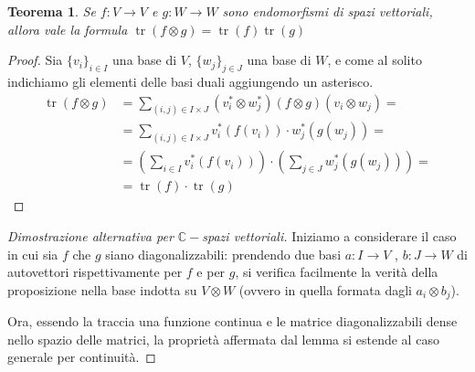 \documentclass[11pt]{article}
\theoremstyle{plain}
\newtheorem{thm}{Teorema}[section]
\theoremstyle{definition}
\theoremstyle{remark}
\newcommand{\C}{\mathbb{C}}
\DeclareMathOperator{\tr}{tr}
\begin{document}
\begin{thm}
Se $f:V\to V$ e $g:W\to W$ sono endomorfismi di spazi vettoriali, allora vale la formula
$\tr(f\otimes g) = \tr(f) \tr(g)$
\label{thm: tracciaprodotto}
\end{thm}
\begin{proof}
Sia $\{v_i\}_{i\in I}$ una base di $V$, $\{w_j\}_{j\in J}$ una base di $W$, e come al solito indichiamo gli elementi delle basi duali aggiungendo un asterisco.
\begin{align*}
 \tr(f\otimes g) &= \sum_{(i,j)\in I\times J} (v_i^*\otimes w_j^*) (f\otimes g)(v_i\otimes w_j) =\\
                 &= \sum_{(i,j)\in I\times J} v_i^*(f(v_i))\cdot w_j^*(g(w_j)) =\\
                 &= \left(\sum_{i\in I} v_i^*(f(v_i))\right) \cdot \left(\sum_{j\in J} w_j^*(g(w_j))\right) =\\
                 &= \tr(f) \cdot \tr(g)
\end{align*}
\end{proof}
\begin{proof}[Dimostrazione alternativa per $\C-$spazi vettoriali]
Iniziamo a considerare il caso in cui sia $f$ che $g$ siano diagonalizzabili: prendendo due basi $a:I\rightarrow V$ , $b:J\rightarrow W$ di autovettori rispettivamente per $f$ e per $g$, si verifica facilmente la verità della proposizione nella base indotta su $V\otimes W$ (ovvero in quella formata dagli $a_i\otimes b_j$).

Ora, essendo la traccia una funzione continua e le matrice diagonalizzabili dense nello spazio delle matrici, la proprietà affermata dal lemma si estende al caso generale per continuità.
\end{proof}
\end{document}
